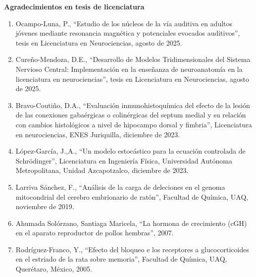 {\large \textbf{Agradecimientos en tesis de licenciatura}}

\hrulefill

\begin{enumerate}

\item Ocampo-Luna, P., “Estudio de los núcleos de la vía auditiva en adultos jóvenes mediante resonancia magnética y potenciales 
evocados 
auditivos”, tesis en Licenciatura en Neurociencias, agosto de 2025.

\item Cureño-Mendoza, D.E., “Desarrollo de Modelos Tridimensionales del Sistema Nervioso Central: Implementación en la enseñanza de 
neuroanatomía 
en la licenciatura en neurociencias”, tesis en Licenciatura en Neurociencias, agosto de 2025.

\item Bravo-Coutiño, D.A., “Evaluación inmunohistoquímica del efecto de la lesión de las conexiones gabaérgicas o colinérgicas del septum 
medial y 
su relación con cambios histológicos a nivel de hipocampo dorsal y fimbria”, Licenciatura en neurociencias, ENES Juriquilla, diciembre de 
2023.

\item López-García, J.,A., “Un modelo estocástico para la ecuación controlada de Schrödinger”, Licenciatura en Ingeniería Física, Universidad 
Autónoma Metropolitana, Unidad Azcapotzalco, diciembre de 2023.

\item Larriva Sánchez, F., “Análisis de la carga de deleciones en el genoma mitocondrial del cerebro embrionario de ratón”, Facultad de 
Química, 
UAQ, noviembre de 2019.

\item Ahumada Solórzano, Santiaga Maricela, “La hormona de crecimiento (cGH) en el aparato reproductor de pollos hembras”, 2007.

\item Rodríguez-Franco, Y., “Efecto del bloqueo e los receptores a glucocorticoides en el estriado de la rata sobre memoria”, Facultad de 
Química, 
UAQ, Querétaro, México, 2005.

\end{enumerate}

